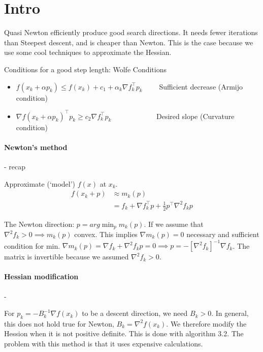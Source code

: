 \documentclass{article}
\begin{document}
\maketitle

\section{Intro}

Quasi Newton efficiently produce good search directions. It needs fewer iterations than Steepest descent, and is cheaper than Newton.
This is the case because we use some cool techniques to approximate the Hessian.

\medskip
Conditions for a good step length: Wolfe Conditions
\begin{itemize}
  \item $f(x_k + \alpha p_k) \leq f(x_k) + c_1 + \alpha_k \nabla f_k^{\top}p_k\qquad$ Sufficient decrease (Armijo condition)
  \item $\nabla f(x_k + \alpha p_k)^{\top}p_k \geq c_2 \nabla f_k^{\top}p_k\qquad\qquad\qquad$ Desired slope (Curvature condition)
\end{itemize}

\paragraph{Newton's method}- recap

\medskip Approximate (`model') $f(x)$ at $x_k$.
\begin{align*}
  f(x_k + p) & \approx m_k(p) \\
             & = f_k + \nabla f_k^{\top} p + \frac{1}{2}p^{\top} \nabla ^2 f_k p
\end{align*}

The Newton direction: $p = arg \min_p m_k(p)$. If we assume that $\nabla ^2 f_k > 0 \implies m_k(p)$ convex. This implies $\nabla m_k(p) = 0$ necessary and sufficient condition for min. 
$\nabla m_k(p) = \nabla f_k + \nabla ^2 f_k p = 0 \implies p = -[\nabla ^2 f_k]^{-1}\nabla f_k$. The matrix is invertible because we assumed $\nabla ^2 f_k > 0$. 

\paragraph{Hessian modification}-

For $p_k = -B_k^{-1}\nabla f(x_k)$ to be a descent direction, we need $B_k > 0$. In general, this does not hold true for Newton, $B_k = \nabla ^2 f(x_k)$. We therefore modify the Hession when
it is not positive definite. This is done with algorithm 3.2. The problem with this method is that it uses expensive calculations. 
\end{document}
